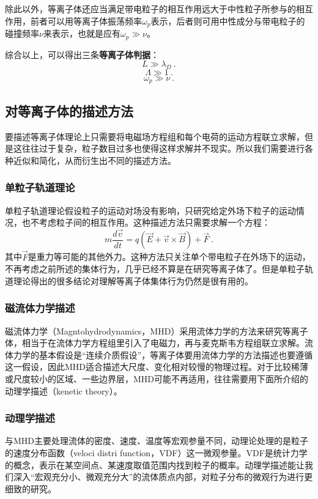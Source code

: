 除此以外，等离子体还应当满足带电粒子的相互作用远大于中性粒子所参与的相互作用，前者可以用等离子体振荡频率$\omega_p$表示，后者则可用中性成分与带电粒子的碰撞频率$\nu$来表示，也就是应有$\omega_p\gg\nu$。
		
综合以上，可以得出三条\textbf{等离子体判据}：
		\begin{equation} 
		L\gg \lambda_D~.
		\end{equation}
		\begin{equation} 
		\varLambda\gg1~.
		\end{equation}
		\begin{equation} 
		\omega_p\gg\nu~.
		\end{equation}
		
\subsection{对等离子体的描述方法}
		
要描述等离子体理论上只需要将电磁场方程组和每个电荷的运动方程联立求解，但是这往往过于复杂，粒子数目过多也使得这样求解并不现实。所以我们需要进行各种近似和简化，从而衍生出不同的描述方法。
\subsubsection{单粒子轨道理论}
			
单粒子轨道理论假设粒子的运动对场没有影响，只研究给定外场下粒子的运动情况，也不考虑粒子间的相互作用。这种描述方法只需要求解一个方程：
			\begin{equation} 
			m\frac{d\vec{v}}{dt}=q(\vec{E}+\vec{v}\times\vec{B})+\vec{F}~.
			\end{equation}
其中$\vec{F}$是重力等可能的其他外力。这种方法只关注单个带电粒子在外场下的运动，不再考虑之前所述的集体行为，几乎已经不算是在研究等离子体了。但是单粒子轨道理论得出的很多结论对理解等离子体集体行为仍然是很有用的。
			
\subsubsection{磁流体力学描述}
磁流体力学（Magntohydrodynamics，MHD）采用流体力学的方法来研究等离子体，相当于在流体力学方程组里引入了电磁力，再与麦克斯韦方程组联立求解。流体力学的基本假设是“连续介质假设”，等离子体要用流体力学的方法描述也要遵循这一假设，因此MHD适合描述大尺度、变化相对较慢的物理过程。对于比较稀薄或尺度较小的区域、一些边界层，MHD可能不再适用，往往需要用下面所介绍的动理学描述（kenetic theory）。
			
\subsubsection{动理学描述}
与MHD主要处理流体的密度、速度、温度等宏观参量不同，动理论处理的是粒子的速度分布函数（veloci distri function，VDF）这一微观参量。VDF是统计力学的概念，表示在某空间点、某速度取值范围内找到粒子的概率。动理学描述能让我们深入“宏观充分小、微观充分大”的流体质点内部，对粒子分布的微观行为进行更细致的研究。
			
